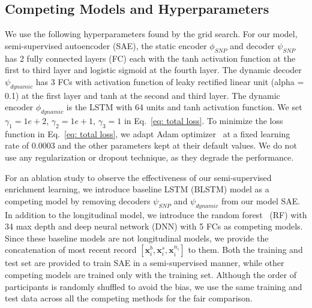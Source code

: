 \subsection{Competing Models and Hyperparameters}
We use the following hyperparameters found by the grid search. For our model, semi-supervised autoencoder (SAE), the static encoder $\phi_{SNP}$ and decoder $\psi_{SNP}$ has 2 fully connected layers (FC) each with the tanh activation function at the first to third layer and logistic sigmoid at the fourth layer. The dynamic decoder $\psi_{dynamic}$ has 3 FCs with activation function of leaky rectified linear unit (alpha = 0.1) at the first layer and tanh at the second and third layer. The dynamic encoder $\phi_{dynamic}$ is the LSTM with 64 units and tanh activation function. We set $\gamma_1 = 1e+2$, $\gamma_2 = 1e+1$, $\gamma_3 = 1$ in Eq.~\eqref{eq: total loss}.
To minimize the loss function in Eq.~\eqref{eq: total loss}, we adapt Adam optimizer~\cite{kingma2014adam} at a fixed learning rate of 0.0003 and the other parameters kept at their default values. We do not use any regularization or dropout technique, as they degrade the performance.

For an ablation study to observe the effectiveness of our semi-supervised enrichment learning, we introduce baseline LSTM (BLSTM) model as a competing model by removing decoders $\psi_{SNP}$ and $\psi_{dynamic}$ from our model SAE. In addition to the longitudinal model, we introduce the random forest~\cite{ho1995random} (RF) with 34 max depth and deep neural network (DNN) with 5 FCs as competing models. Since these baseline models are not longitudinal models, we provide the concatenation of most recent record $[\mathbf{x}_i^b, \mathbf{x}_i^s, \mathbf{x}_i^{n_i}]$ to them. Both the training and test set are provided to train SAE in a semi-supervised manner, while other competing models are trained only with the training set. Although the order of participants is randomly shuffled to avoid the bias, we use the same training and test data across all the competing methods for the fair comparison.
